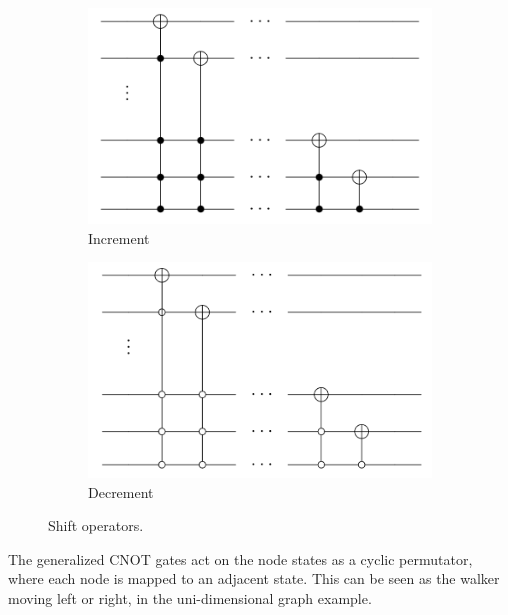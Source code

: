 \documentclass[../../dissertation.tex]{subfiles}
\begin{document}
\begin{figure}[!h]
  \centering
  \begin{subfigure}[t]{.4\textwidth}
    \centering
    \includegraphics[width=\linewidth]{img/QCircuit/CoinedQuantumWalk/DouglasWangIncrement.png}
    \caption{Increment}
  \end{subfigure}
  \begin{subfigure}[t]{.4\textwidth}
    \centering
    \includegraphics[width=\linewidth]{img/QCircuit/CoinedQuantumWalk/DouglasWangDecrement.png}
    \caption{Decrement}
  \end{subfigure}
  \caption{Shift operators.}
  \label{fig:douglasWangShift}
\end{figure}

The generalized CNOT gates act on the node states as a cyclic permutator, where each node is mapped to an adjacent state. This can be seen as the walker moving left or right, in the uni-dimensional graph example.\par
\end{document}

